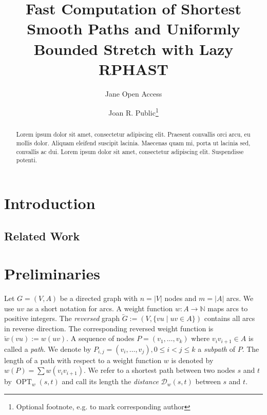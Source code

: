 \documentclass[a4paper,UKenglish,cleveref, autoref, thm-restate]{lipics-v2021}
\title{Fast Computation of Shortest Smooth Paths and Uniformly Bounded Stretch with Lazy RPHAST} %
\author{Jane {Open Access}}{Dummy University Computing Laboratory, [optional: Address], Country \and My second affiliation, Country \and \url{http://www.myhomepage.edu} }{johnqpublic@dummyuni.org}{https://orcid.org/0000-0002-1825-0097}{(Optional) author-specific funding acknowledgements}%
\author{Joan R. Public\footnote{Optional footnote, e.g. to mark corresponding author}}{Department of Informatics, Dummy College, [optional: Address], Country}{joanrpublic@dummycollege.org}{[orcid]}{[funding]}
\newcommand*{\dist}{\mathcal{D}}
\newcommand*{\shp}{\operatorname{OPT}}
\begin{document}
\maketitle

\begin{abstract}
Lorem ipsum dolor sit amet, consectetur adipiscing elit. Praesent convallis orci arcu, eu mollis dolor. Aliquam eleifend suscipit lacinia. Maecenas quam mi, porta ut lacinia sed, convallis ac dui. Lorem ipsum dolor sit amet, consectetur adipiscing elit. Suspendisse potenti. 
\end{abstract}

\newpage

\section{Introduction}
\subsection{Related Work}
\cite{bdgmpsww-rptn-16}

\section{Preliminaries}
\label{sec:prelim}

Let $G=(V,A)$ be a directed graph with $n = |V|$ nodes and $m = |A|$ arcs.
We use $uv$ as a short notation for arcs.
A weight function $w : A \to \mathbb{N}$ maps arcs to positive integers.
The \emph{reversed} graph $\overleftarrow{G} := (V, \{ vu \mid uv \in A \})$ contains all arcs in reverse direction.
The corresponding reversed weight function is $\overleftarrow{w}(vu) := w(uv)$.
A sequence of nodes $P = (v_1, \dots, v_k)$ where $v_i v_{i+1} \in A$ is called a \emph{path}.
We denote by $P_{i,j} = (v_i, \dots, v_j), 0 \leq i < j \leq k$ a \emph{subpath} of $P$.
The length of a path with respect to a weight function $w$ is denoted by $w(P) = \sum w(v_i v_{i+1})$.
We refer to a shortest path between two nodes $s$ and $t$ by $\shp_w(s,t)$ and call its length the \emph{distance} $\dist_w(s,t)$ between $s$ and $t$.
\end{document}
